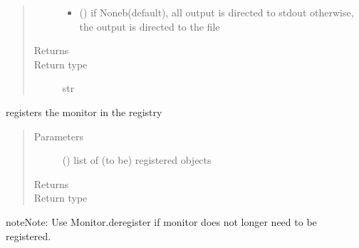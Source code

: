 \documentclass[letterpaper,10pt,english]{sphinxmanual}
\begin{document}
\begin{fulllineitems}
\begin{fulllineitems}
\begin{quote}
\begin{description}
\begin{itemize}
\item {} 
 () \textendash{} if Noneb(default), all output is directed to stdout 
otherwise, the output is directed to the file

\end{itemize}

\item[{Returns}] \leavevmode
{}

\item[{Return type}] \leavevmode
str

\end{description}\end{quote}

\end{fulllineitems}


\begin{fulllineitems}
\label{\detokenize{Reference:salabim.Monitor.register}}
registers the monitor in the registry
\begin{quote}\begin{description}
\item[{Parameters}] \leavevmode
{} () \textendash{} list of (to be) registered objects

\item[{Returns}] \leavevmode
{}

\item[{Return type}] \leavevmode
{\hyperref[\detokenize{Reference:salabim.Monitor}]{}}

\end{description}\end{quote}

\begin{sphinxadmonition}{note}{Note:}
Use Monitor.deregister if monitor does not longer need to be registered.
\end{sphinxadmonition}

\end{fulllineitems}



\end{fulllineitems}
\end{document}
